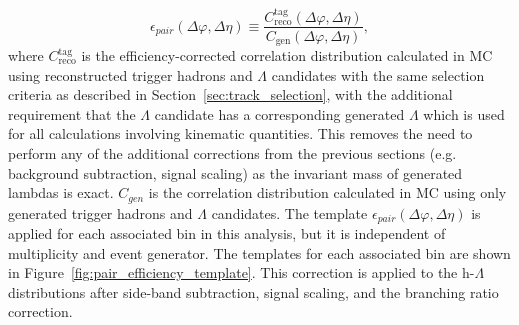 %
\begin{equation}
    \epsilon_{pair}(\Delta\varphi, \Delta\eta) \equiv \frac{C_{\text{reco}}^{\text{tag}}(\Delta\varphi, \Delta\eta)}{C_{\text{gen}}(\Delta\varphi, \Delta\eta)},
\label{eq:paircorr}
\end{equation}
%
where $C_{\text{reco}}^{\text{tag}}$ is the efficiency-corrected correlation distribution calculated in MC using reconstructed trigger hadrons and $\Lambda$ candidates with the same selection criteria as described in Section~\ref{sec:track_selection}, with the additional requirement that the $\Lambda$ candidate has a corresponding generated $\Lambda$ which is used for all calculations involving kinematic quantities. This removes the need to perform any of the additional corrections from the previous sections (e.g. background subtraction, signal scaling) as the invariant mass of generated lambdas is exact. $C_{gen}$ is the correlation distribution calculated in MC using only generated trigger hadrons and $\Lambda$ candidates. The template $\epsilon_{pair}(\Delta\varphi, \Delta\eta)$ is applied for each associated \pt bin in this analysis, but it is independent of multiplicity and event generator. The templates for each associated \pt bin are shown in Figure~\ref{fig:pair_efficiency_template}. This correction is applied to the h-$\Lambda$ distributions after side-band subtraction, signal scaling, and the branching ratio correction.

